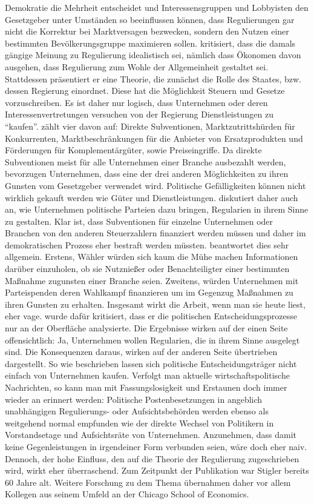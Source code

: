 Demokratie die Mehrheit entscheidet und Interessensgruppen und Lobbyisten den Gesetzgeber unter Umständen so beeinflussen können, dass Regulierungen gar nicht die Korrektur bei Marktversagen bezwecken, sondern den Nutzen einer bestimmten Bevölkerungsgruppe maximieren sollen.
\textcite[S. 17]{Stigler1971} kritisiert, dass die damals gängige Meinung zu Regulierung idealistisch sei, nämlich dass Ökonomen davon ausgehen, dass Regulierung zum Wohle der Allgemeinheit gestaltet sei. Stattdessen präsentiert er eine Theorie, die zunächst die Rolle des Staates, bzw. dessen Regierung einordnet. Diese hat die Möglichkeit Steuern und Gesetze vorzuschreiben. Es ist daher nur logisch, dass Unternehmen oder deren Interessenvertretungen versuchen von der Regierung Dienstleistungen zu "`kaufen"'. \textcite[S. 3ff]{Stigler1971} zählt vier davon auf: Direkte Subventionen, Marktzutrittshürden für Konkurrenten, Marktbeschränkungen für die Anbieter von Ersatzprodukten und Förderungen für Komplementärgüter, sowie Preiseingriffe. Da direkte Subventionen meist für alle Unternehmen einer Branche ausbezahlt werden, bevorzugen Unternehmen, dass eine der drei anderen Möglichkeiten zu ihren Gunsten vom Gesetzgeber verwendet wird. Politische Gefälligkeiten können nicht wirklich gekauft werden wie Güter und Dienstleistungen. \textcite{Stigler1971} diskutiert daher auch an, wie Unternehmen politische Parteien dazu bringen, Regularien in ihrem Sinne zu gestalten. Klar ist, dass Subventionen für einzelne Unternehmen oder Branchen von den anderen Steuerzahlern finanziert werden müssen und daher im demokratischen Prozess eher bestraft werden müssten. \textcite[S. 10ff]{Stigler1971} beantwortet dies sehr allgemein. Erstens, Wähler würden sich kaum die Mühe machen Informationen darüber einzuholen, ob sie Nutznießer oder Benachteiligter einer bestimmten Maßnahme zugunsten einer Branche seien. Zweitens, würden Unternehmen mit Parteispenden deren Wahlkampf finanzieren um im Gegenzug Maßnahmen zu ihren Gunsten zu erhalten. Insgesamt wirkt die Arbeit, wenn man sie heute liest, eher vage. \textcite{Stigler1971} wurde dafür kritisiert, dass er die politischen Entscheidungsprozesse nur an der Oberfläche analysierte. Die Ergebnisse wirken auf der einen Seite offensichtlich: Ja, Unternehmen wollen Regularien, die in ihrem Sinne ausgelegt sind. Die Konsequenzen daraus, wirken  auf der anderen Seite übertrieben dargestellt. So wie beschrieben lassen sich politische Entscheidungsträger nicht einfach von Unternehmen kaufen. Verfolgt man aktuelle wirtschaftspolitische Nachrichten, so kann man mit Fassungslosigkeit und Erstaunen doch immer wieder an \textcite{Stigler1971} erinnert werden: Politische Postenbesetzungen in angeblich unabhängigen Regulierungs- oder Aufsichtsbehörden werden ebenso als weitgehend normal empfunden wie der direkte Wechsel von Politikern in Vorstandsetage und Aufsichtsräte von Unternehmen. Anzunehmen, dass damit keine Gegenleistungen in irgendeiner Form verbunden seien, wäre doch eher naiv. Dennoch, der hohe Einfluss, den \textcite{Stigler1971} auf die Theorie der Regulierung zugeschrieben wird, wirkt eher überraschend. Zum Zeitpunkt der Publikation war Stigler bereits 60 Jahre alt. Weitere Forschung zu dem Thema übernahmen daher vor allem Kollegen aus seinem Umfeld an der Chicago School of Economics. 